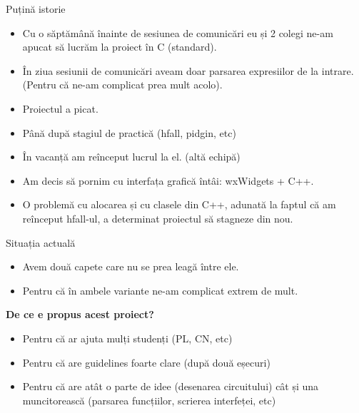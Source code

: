 \documentclass{beamer}
\begin{document}
\begin{frame}{Puțină istorie}
\begin{itemize}
\item Cu o săptămână înainte de sesiunea de comunicări eu și 2 colegi ne-am apucat să lucrăm la proiect în C (standard).
\item \pause În ziua sesiunii de comunicări aveam doar parsarea expresiilor de la intrare. (Pentru că ne-am complicat prea mult acolo).
\item \pause Proiectul a picat.
\item \pause Până după stagiul de practică (hfall, pidgin, etc)
\item \pause În vacanță am reînceput lucrul la el. (altă echipă)
\item \pause Am decis să pornim cu interfața grafică întâi: wxWidgets + C++.
\item \pause O problemă cu alocarea și cu clasele din C++, adunată la faptul că am reînceput hfall-ul, a determinat proiectul să stagneze din nou.
\end{itemize}
\end{frame}

\begin{frame}{Situația actuală}
\begin{itemize}
\item Avem două capete care nu se prea leagă între ele.
\item \pause Pentru că în ambele variante ne-am complicat extrem de mult.
\end{itemize}\vspace{5mm}
\pause \begin{center}{\huge \bf De ce e propus acest proiect?}\end{center}
\begin{itemize}
\item \pause Pentru că ar ajuta mulți studenți (PL, CN, etc)
\item \pause Pentru că are guidelines foarte clare (după două eșecuri)
\item \pause Pentru că are atât o parte de idee (desenarea circuitului) cât și una muncitorească (parsarea funcțiilor, scrierea interfeței, etc)
\end{itemize}
\end{frame}
\end{document}
